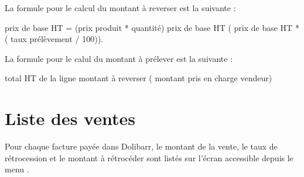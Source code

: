 \documentclass[letterpaper,10pt,english]{sphinxmanual}
\begin{document}
La formule pour le calcul du montant à reverser est la suivante :

\begin{sphinxVerbatim}[commandchars=\\\{\}]
prix de base HT = (prix produit * quantité)
prix de base HT  \PYGZhy{} ( prix de base HT * ( taux prélèvement / 100)).
\end{sphinxVerbatim}

La formule pour le calul du montant à prélever est la suivante :

\begin{sphinxVerbatim}[commandchars=\\\{\}]
total HT de la ligne \PYGZhy{} montant à reverser (\PYGZhy{} montant pris en charge vendeur)
\end{sphinxVerbatim}


\section{Liste des ventes}
\label{\detokenize{ventes:liste-des-ventes}}
Pour chaque facture payée dans Dolibarr, le montant de la vente, le taux de rétrocession et le montant à rétrocéder sont listés sur l'écran accessible depuis le menu .

\end{document}
